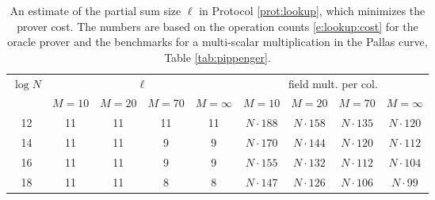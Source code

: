 \documentclass[11pt]{article}
\theoremstyle{definition}
\theoremstyle{definition}
\begin{document}
\begin{table}
\caption{%
An estimate of the partial sum size $\ell$ in Protocol \ref{prot:lookup}, which minimizes the prover cost. 
The numbers are based on the operation counts \eqref{e:lookup:cost} for the oracle prover and the benchmarks for a multi-scalar multiplication in the Pallas curve, Table \ref{tab:pippenger}.
}
\label{tab:lookup:optimal}
\vspace*{0.5cm}
\centering
\begin{tabular} {|c|c|c|c|c|c|c|c|c|}
\hline
\multirow{2}{*}{$\log N$} & \multicolumn{4}{c|}{$\ell$} & \multicolumn{4}{c|}{field mult. per col.} 
\\\cline{2-9}
& $M=10$ & $M=20$ & $M=70$ & $M=\infty$ & $M=10$ & $M=20$ & $M=70$ & $M=\infty$
\\\hline
12 & 11 & 11 & 11 & 11 & $N\cdot 188$ & $N\cdot 158$ &  $N\cdot 135$ &  $N\cdot 120$
\\
14 & 11 & 11 & 9 & 9 & $N\cdot 170$ & $N\cdot 144$ &  $N\cdot 120$ &  $N\cdot 112$
\\
16 & 11 & 11 & 9 & 9 & $N\cdot 155$ & $N\cdot 132$ &  $N\cdot 112$&  $N\cdot 104$
\\
18 & 11 & 11 & 8 &  8 &  $N\cdot 147$ & $N\cdot 126$  &  $N\cdot 106$ &  $N\cdot 99$
\\\hline
\end{tabular}
\end{table}




\end{document}
